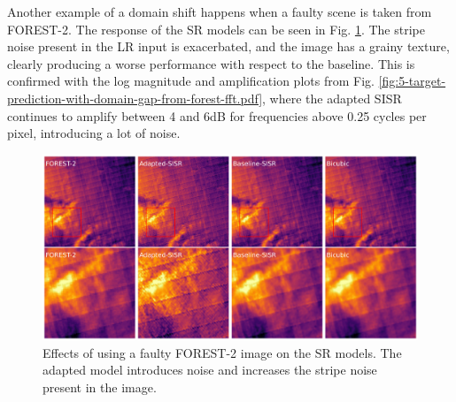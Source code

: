     Another example of a domain shift happens when a faulty scene is taken from FOREST-2. The response of the SR models can be seen in Fig. \ref{fig:target-prediction-with-domain-gap-from-forest-.pdf}. The stripe noise present in the LR input is exacerbated, and the image has a grainy texture, clearly producing a worse performance with respect to the baseline. This is confirmed with the log magnitude and amplification plots from Fig. \ref{fig:5-target-prediction-with-domain-gap-from-forest-fft.pdf}, where the adapted SISR continues to amplify between 4 and 6dB for frequencies above 0.25 cycles per pixel, introducing a lot of noise.


     \begin{figure}[H]
        \centering
        \includegraphics[width=\textwidth]{Includes/5-target-prediction-with-domain-gap-from-forest-.pdf}
        \caption{\small{ Effects of using a faulty FOREST-2 image on the SR models. The adapted model introduces noise and increases the stripe noise present in the image.}}
        \label{fig:target-prediction-with-domain-gap-from-forest-.pdf}
    \end{figure}

